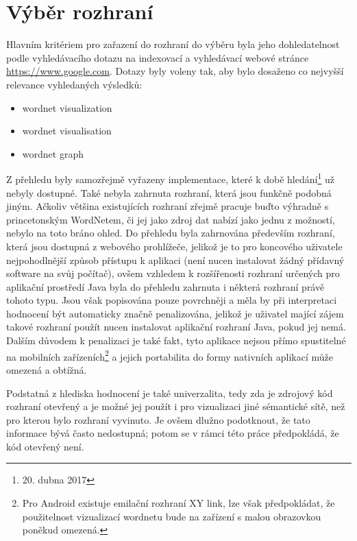 \documentclass[a4paper, 11pt, oneside]{book}
\begin{document}
			\section{Výběr rozhraní}

				Hlavním kritériem pro zařazení do rozhraní do výběru byla jeho dohledatelnost podle vyhledávacího dotazu na indexovací a vyhledávací webové stránce \url{https://www.google.com}. Dotazy byly voleny tak, aby bylo dosaženo co nejvyšší relevance vyhledaných výsledků:

					\begin{itemize}
						\item wordnet visualization
						\item wordnet visualisation
						\item wordnet graph
					\end{itemize}

				Z přehledu byly samozřejmě vyřazeny implementace, které k době hledání\footnote{20. dubna 2017} už nebyly dostupné. Také nebyla zahrnuta rozhraní, která jsou funkčně podobná jiným. Ačkoliv většina existujících rozhraní zřejmě pracuje buďto výhradně s princetonským WordNetem, či jej jako zdroj dat nabízí jako jednu z možností, nebylo na toto bráno ohled. Do přehledu byla zahrnována především rozhraní, která jsou dostupná z webového prohlížeče, jelikož je to pro koncového uživatele nejpohodlnější způsob přístupu k aplikaci (není nucen instalovat žádný přídavný software na svůj počítač), ovšem vzhledem k rozšířenosti rozhraní určených pro aplikační prostředí Java byla do přehledu zahrnuta i některá rozhraní právě tohoto typu. Jsou však popisována pouze povrchněji a měla by při interpretaci hodnocení být automaticky značně penalizována, jelikož je uživatel mající zájem takové rozhraní použít nucen instalovat aplikační rozhraní Java, pokud jej nemá. Dalším důvodem k penalizaci je také fakt, tyto aplikace nejsou přímo spustitelné na mobilních zařízeních\footnote{Pro Android existuje emilační rozhraní XY link, lze však předpokládat, že použitelnost vizualizací wordnetu bude na zařízení s malou obrazovkou poněkud omezená.} \parencite{gronli2014mobile} a jejich portabilita do formy nativních aplikací může omezená a obtížná.

				Podstatná z hlediska hodnocení je také univerzalita, tedy zda je zdrojový kód rozhraní otevřený a je možné jej použít i pro vizualizaci jiné sémantické sítě, než pro kterou bylo rozhraní vyvinuto. Je ovšem dlužno podotknout, že tato informace bývá často nedostupná; potom se v rámci této práce předpokládá, že kód otevřený není.
\end{document}

